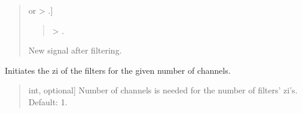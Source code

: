 \documentclass[letterpaper,10pt,english]{sphinxmanual}
\begin{document}
\begin{fulllineitems}
\begin{fulllineitems}
\begin{quote}
\begin{description}
\begin{description}
\end{description}

\begin{description}
\sphinxlineitem{\sphinxstylestrong{new\_sig}}{[} or  \sphinxhyphen{}\textgreater{} .{]}\begin{quote}

\sphinxAtStartPar
{} \sphinxhyphen{}\textgreater{} .
\end{quote}

\sphinxAtStartPar
New signal after filtering.

\end{description}

\end{description}\end{quote}

\end{fulllineitems}


\begin{fulllineitems}
\label{\detokenize{classes:dsptools.classes.filterbank.FilterBank.initialize_zi}}
\pysigstartsignatures
{}
\pysigstopsignatures
\sphinxAtStartPar
Initiates the zi of the filters for the given number of channels.
\begin{quote}\begin{description}
\begin{description}
\sphinxlineitem{\sphinxstylestrong{number\_of\_channels}}{[}int, optional{]}
\sphinxAtStartPar
Number of channels is needed for the number of filters’ zi’s.
Default: 1.

\end{description}

\end{description}\end{quote}

\end{fulllineitems}


\end{fulllineitems}
\end{document}
